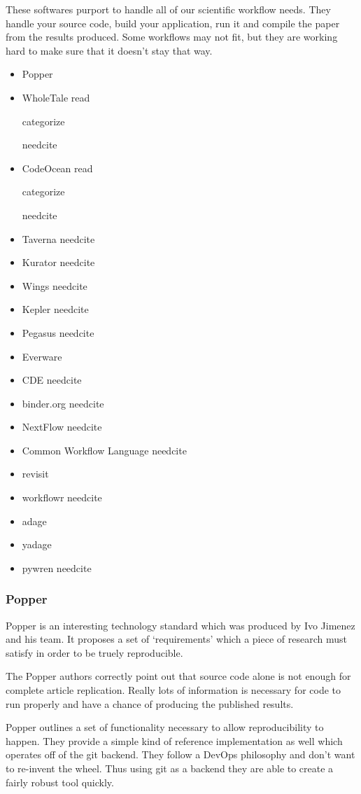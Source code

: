 \documentclass[american]{article}
\newcommand{\Read}{
	\gls{read}
}
\newcommand{\categorize}{
	\gls{categorize}
}
\newcommand{\needcite}{
	\gls{needcite}
}
\begin{document}
These softwares purport to handle all of our scientific workflow needs. They handle your source code, build your application, run it and compile the paper from the results produced. Some workflows may not fit, but they are working hard to make sure that it doesn't stay that way.

\begin{itemize}
\item Popper \cite{popper}
\item WholeTale \Read \categorize \needcite
\item CodeOcean \Read \categorize \needcite
\item Taverna \needcite
\item Kurator \needcite
\item Wings \needcite
\item Kepler \needcite
\item Pegasus \needcite
\item Everware \cite{everware}
\item CDE \needcite
\item binder.org \needcite
\item NextFlow \needcite
\item Common Workflow Language \needcite
\item revisit \cite{matloff-revisit-2017}
\item workflowr \needcite
\item adage
\item yadage \cite{cranmer-yadage-packtivity-2017}
\item pywren \needcite
\end{itemize}

\subsubsection{Popper} \label{sec:software-managers-popper}

Popper \cite{popper} is an interesting technology standard which was produced by Ivo Jimenez and his team. It proposes a set of `requirements' which a piece of research must satisfy in order to be truely reproducible.

The Popper authors correctly point out that source code alone is not enough for complete article replication. Really lots of information is necessary for code to run properly and have a chance of producing the published results.

Popper outlines a set of functionality necessary to allow reproducibility to happen. They provide a simple kind of reference implementation as well which operates off of the git backend. They follow a DevOps philosophy and don't want to re-invent the wheel. Thus using git as a backend they are able to create a fairly robust tool quickly.
\end{document}
